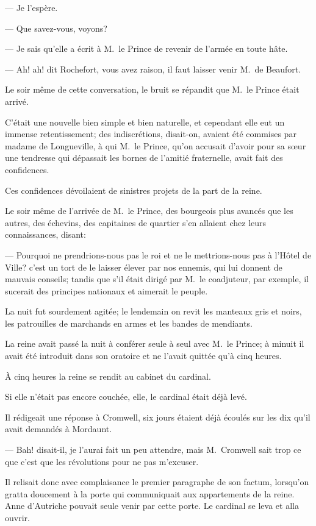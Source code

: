 — Je l'espère.

— Que savez-vous, voyons?

— Je sais qu'elle a écrit à M.~le Prince de revenir de l'armée en toute hâte.

— Ah! ah! dit Rochefort, vous avez raison, il faut laisser venir M.~de Beaufort.

Le soir même de cette conversation, le bruit se répandit que M.~le Prince était arrivé.

C'était une nouvelle bien simple et bien naturelle, et cependant elle eut un immense retentissement; des indiscrétions, disait-on, avaient été commises par madame de Longueville, à qui M.~le Prince, qu'on accusait d'avoir pour sa sœur une tendresse qui dépassait les bornes de l'amitié fraternelle, avait fait des confidences.

Ces confidences dévoilaient de sinistres projets de la part de la reine.

Le soir même de l'arrivée de M.~le Prince, des bourgeois plus avancés que les autres, des échevins, des capitaines de quartier s'en allaient chez leurs connaissances, disant:

— Pourquoi ne prendrions-nous pas le roi et ne le mettrions-nous pas à l'Hôtel de Ville? c'est un tort de le laisser élever par nos ennemis, qui lui donnent de mauvais conseils; tandis que s'il était dirigé par M.~le coadjuteur, par exemple, il sucerait des principes nationaux et aimerait le peuple.

La nuit fut sourdement agitée; le lendemain on revit les manteaux gris et noirs, les patrouilles de marchands en armes et les bandes de mendiants.

La reine avait passé la nuit à conférer seule à seul avec M.~le Prince; à minuit il avait été introduit dans son oratoire et ne l'avait quittée qu'à cinq heures.

À cinq heures la reine se rendit au cabinet du cardinal.

Si elle n'était pas encore couchée, elle, le cardinal était déjà levé.

Il rédigeait une réponse à Cromwell, six jours étaient déjà écoulés sur les dix qu'il avait demandés à Mordaunt.

— Bah! disait-il, je l'aurai fait un peu attendre, mais M.~Cromwell sait trop ce que c'est que les révolutions pour ne pas m'excuser.

Il relisait donc avec complaisance le premier paragraphe de son factum, lorsqu'on gratta doucement à la porte qui communiquait aux appartements de la reine. Anne d'Autriche pouvait seule venir par cette porte. Le cardinal se leva et alla ouvrir.

